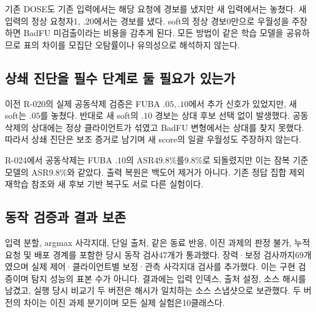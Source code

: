 \documentclass[10pt,a4paper]{article}
\begin{document}
기존 DOSE도 기존 입력에서는 해당 요청에 경보를 냈지만 새 입력에서는 놓쳤다.
새 입력의 정상 요청자1, $.20$에서는 경보를 냈다.
soft의 정상 경보0만으로 우월성을 주장하면 BadFU 미검출이라는 비용을 감추게 된다.
모든 방법이 같은 학습 모델을 공유하므로 표의 차이를 모집단 오탐률이나 유의성으로 해석하지 않는다.

\subsection{상쇄 진단을 필수 단계로 둘 필요가 있는가}
이전 R-020의 실제 공동삭제 검증은 FUBA $.05,.10$에서 추가 신호가 있었지만,
새 soft는 $.05$를 놓쳤다. 반대로 새 soft의 $.10$ 경보는 상대 후보 선택 없이 발생했다.
공동삭제의 상대에는 정상 클라이언트가 섞였고 BadFU 변형에서는 상대를 찾지 못했다.
따라서 상쇄 진단은 보조 증거로 남기며 새 score의 일괄 우월성도 주장하지 않는다.

R-024에서 공동삭제는 FUBA $.10$의 ASR49.8\%를9.8\%로 되돌렸지만
이는 잠복 기준 모델의 ASR9.8\%와 같았다. 출력 복원은 백도어 제거가 아니다.
기존 정답 집합 제외 재학습 참조와 새 후보 기반 복구도 서로 다른 실험이다.

\subsection{동작 검증과 결과 보존}
입력 분할, argmax 사각지대, 단일 출처, 같은 동료 반응, 이진 과제의 판정 불가,
누적 요청 및 배포 경계를 포함한 당시 동작 검사47개가 통과했다.
장력·보정 검사까지69개였으며 실제 제어·클라이언트별 보정·관측 사각지대 검사를 추가했다.
이는 구현 검증이며 탐지 성능의 표본 수가 아니다.
결과에는 입력 인덱스, 출처 설정, 소스 해시를 남겼고,
실행 당시 비교기 두 버전은 해시가 일치하는 소스 스냅샷으로 보관했다.
두 버전의 차이는 이진 과제 분기이며 모든 실제 실험은10클래스다.
\end{document}
